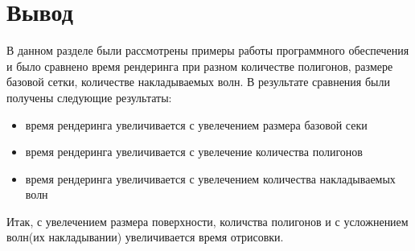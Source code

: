 \newpage
\section*{Вывод}

В данном разделе были рассмотрены примеры работы программного обеспечения и было сравнено время рендеринга при разном количестве полигонов, размере базовой сетки, количестве накладываемых волн. В результате сравнения были получены следующие результаты:

\begin{itemize}
	\item время рендеринга увеличивается с увелечением размера базовой секи
	\item время рендеринга увеличивается с увелечение  количества полигонов
	\item время рендеринга увеличивается с увелечением количества накладываемых волн
\end{itemize}

Итак, с увелечением размера поверхности, количства полигонов и с усложнением волн(их накладывании) увеличивается время отрисовки.




